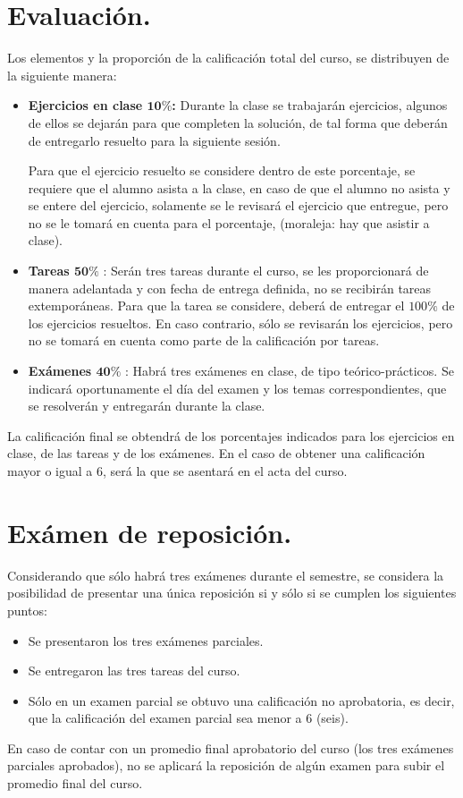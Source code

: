 \documentclass[12pt]{article}
\begin{document}
\section{Evaluación.}
Los elementos y la proporción de la calificación total del curso, se distribuyen de la siguiente manera:
\begin{itemize}
\item \textbf{Ejercicios en clase $\mathbf{10\%}$:} Durante la clase se trabajarán ejercicios, algunos de ellos se dejarán para que completen la solución, de tal forma que deberán de entregarlo resuelto para la siguiente sesión.
\par
Para que el ejercicio resuelto se considere dentro de este porcentaje, se requiere que el alumno asista a la clase, en caso de que el alumno no asista y se entere del ejercicio, solamente se le revisará el ejercicio que entregue, pero no se le tomará en cuenta para el porcentaje, (moraleja: hay que asistir a clase).
\item \textbf{Tareas $\mathbf{50\%}$} : Serán tres tareas durante el curso, se les proporcionará de manera adelantada y con fecha de entrega definida, no se recibirán tareas extemporáneas. Para que la tarea se considere, deberá de entregar el $100\%$ de los ejercicios resueltos. En caso contrario, sólo se revisarán los ejercicios, pero no se tomará en cuenta como parte de la calificación por tareas.
\item \textbf{Exámenes $\mathbf{40\%}$} : Habrá tres exámenes en clase, de tipo teórico-prácticos. Se indicará oportunamente el día del examen y los temas correspondientes, que se resolverán y entregarán durante la clase.
\end{itemize}
La calificación final se obtendrá de los porcentajes indicados para los ejercicios en clase, de las tareas y de los exámenes. En el caso de obtener una calificación mayor o igual a $6$, será la que se asentará en el acta del curso.
\section{Exámen de reposición.}
Considerando que sólo habrá tres exámenes durante el semestre, se considera la posibilidad de presentar una única reposición si y sólo si se cumplen los siguientes puntos:
\begin{itemize}
\item Se presentaron los tres exámenes parciales.
\item Se entregaron las tres tareas del curso.
\item Sólo en un examen parcial se obtuvo una calificación no aprobatoria, es decir, que la calificación del examen parcial sea menor a $6$ (seis).
\end{itemize}
En caso de contar con un promedio final aprobatorio del curso (los tres exámenes parciales aprobados), no se aplicará la reposición de algún examen para subir el promedio final del curso.
\end{document}
